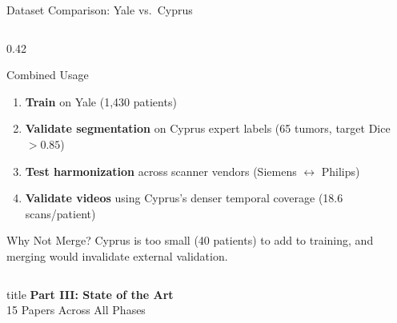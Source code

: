 \documentclass[aspectratio=169,xcolor=dvipsnames]{beamer}
\begin{document}
\begin{frame}{Dataset Comparison: Yale vs.\ Cyprus}
\begin{columns}
        \begin{column}{0.42\textwidth}
            \begin{exampleblock}{Combined Usage}
                \small
                \begin{enumerate}
                    \item \textbf{Train} on Yale (1,430 patients)
                    \item \textbf{Validate segmentation} on Cyprus expert labels (65 tumors, target Dice $>0.85$)
                    \item \textbf{Test harmonization} across scanner vendors (Siemens $\leftrightarrow$ Philips)
                    \item \textbf{Validate videos} using Cyprus's denser temporal coverage (18.6 scans/patient)
                \end{enumerate}
            \end{exampleblock}

            \vspace{0.2em}

            \begin{alertblock}{\small Why Not Merge?}
                \scriptsize Cyprus is too small (40 patients) to add to training, and merging would invalidate external validation.
            \end{alertblock}
        \end{column}
    \end{columns}
\end{frame}

\begin{frame}[plain]
    \centering
    \vfill
    \begin{beamercolorbox}[center,shadow=true,rounded=true]{title}
        \textbf{Part III: State of the Art}\\
        \vspace{0.5em}
        \large 15 Papers Across All Phases
    \end{beamercolorbox}
    \vfill
\end{frame}
\end{document}
